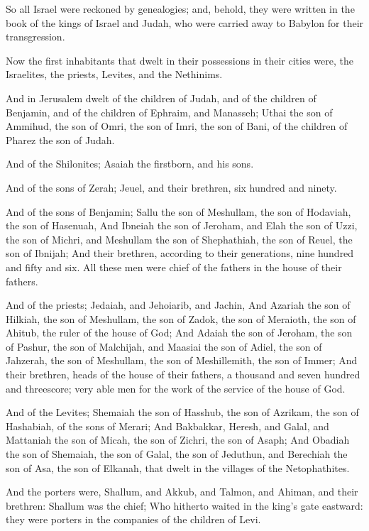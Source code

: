 \Chapter
\Verse So all Israel were reckoned by genealogies; and, behold, they were written in the book of the kings of Israel and Judah, who were carried away to Babylon for their transgression.

\Verse Now the first inhabitants that dwelt in their possessions in their cities were, the Israelites, the priests, Levites, and the Nethinims.

\Verse And in Jerusalem dwelt of the children of Judah, and of the children of Benjamin, and of the children of Ephraim, and Manasseh; \Verse Uthai the son of Ammihud, the son of Omri, the son of Imri, the son of Bani, of the children of Pharez the son of Judah.

\Verse And of the Shilonites; Asaiah the firstborn, and his sons.

\Verse And of the sons of Zerah; Jeuel, and their brethren, six hundred and ninety.

\Verse And of the sons of Benjamin; Sallu the son of Meshullam, the son of Hodaviah, the son of Hasenuah, \Verse And Ibneiah the son of Jeroham, and Elah the son of Uzzi, the son of Michri, and Meshullam the son of Shephathiah, the son of Reuel, the son of Ibnijah; \Verse And their brethren, according to their generations, nine hundred and fifty and six. All these men were chief of the fathers in the house of their fathers.

\Verse And of the priests; Jedaiah, and Jehoiarib, and Jachin, \Verse And Azariah the son of Hilkiah, the son of Meshullam, the son of Zadok, the son of Meraioth, the son of Ahitub, the ruler of the house of God; \Verse And Adaiah the son of Jeroham, the son of Pashur, the son of Malchijah, and Maasiai the son of Adiel, the son of Jahzerah, the son of Meshullam, the son of Meshillemith, the son of Immer; \Verse And their brethren, heads of the house of their fathers, a thousand and seven hundred and threescore; very able men for the work of the service of the house of God.

\Verse And of the Levites; Shemaiah the son of Hasshub, the son of Azrikam, the son of Hashabiah, of the sons of Merari; \Verse And Bakbakkar, Heresh, and Galal, and Mattaniah the son of Micah, the son of Zichri, the son of Asaph; \Verse And Obadiah the son of Shemaiah, the son of Galal, the son of Jeduthun, and Berechiah the son of Asa, the son of Elkanah, that dwelt in the villages of the Netophathites.

\Verse And the porters were, Shallum, and Akkub, and Talmon, and Ahiman, and their brethren: Shallum was the chief; \Verse Who hitherto waited in the king's gate eastward: they were porters in the companies of the children of Levi.

